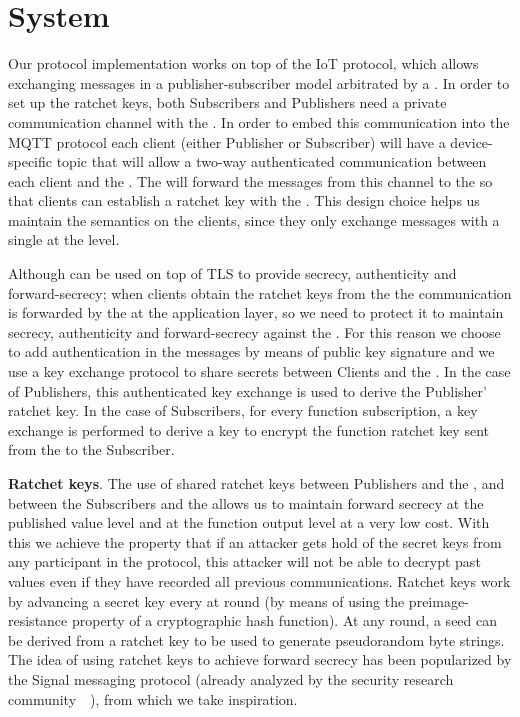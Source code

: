 \section{System}
\label{sec:system}

Our protocol implementation works on top of the IoT \MQTT{} protocol, which
allows exchanging messages in a publisher-subscriber model arbitrated by a
\broker.  In order to set up the ratchet keys, both Subscribers and Publishers
need a private communication channel with the \garbler.  In order to embed
this communication into the MQTT protocol each client (either Publisher or
Subscriber) will have a device-specific topic that will allow a two-way
authenticated communication between each client and the \broker.  The \broker
will forward the messages from this channel to the \garbler so that clients
can establish a ratchet key with the \garbler.  This design choice helps us
maintain the \MQTT{} semantics on the clients, since they only exchange
messages with a single \broker at the \MQTT{} level.

Although \MQTT{} can be used on top of TLS to provide secrecy, authenticity and
forward-secrecy; when clients obtain the ratchet keys from the \garbler
the communication is forwarded by the \broker at the application layer, so we
need to protect it to maintain secrecy, authenticity and forward-secrecy
against the \broker.  For this reason we choose to add authentication in the
\MQTT{} messages by means of public key signature and we use a key exchange
protocol to share secrets between Clients and the \garbler.  In the case of
Publishers, this authenticated key exchange is used to derive the Publisher'
ratchet key.  In the case of Subscribers, for every function subscription, a
key exchange is performed to derive a key to encrypt the function ratchet key
sent from the \garbler to the Subscriber.

\noindent\textbf{Ratchet keys}.  The use of shared ratchet keys between
Publishers and the \garbler, and between the Subscribers and the \garbler
allows us to maintain forward secrecy at the published value level and at the
function output level at a very low cost.  With this we achieve the property
that if an attacker gets hold of the secret keys from any participant in the
protocol, this attacker will not be able to decrypt past values even if they
have recorded all previous communications.  Ratchet keys work by advancing a
secret key every at round (by means of using the preimage-resistance property
of a cryptographic hash function).  At any round, a seed can be derived from a
ratchet key to be used to generate pseudorandom byte strings.  The idea of
using ratchet keys to achieve forward secrecy has been popularized by the
Signal messaging protocol (already analyzed by the security research
community~\cite{signal1}~\cite{signal2}), from which we take inspiration.

